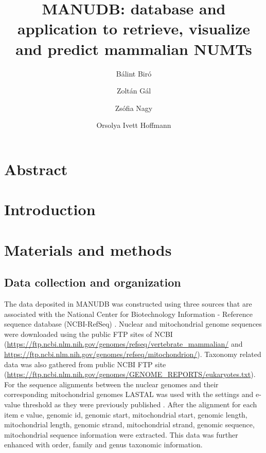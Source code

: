 \documentclass{article}
\title{MANUDB: database and application to retrieve, visualize and predict mammalian NUMTs}
\begin{document}
\author[1,2]{Bálint Biró}
\author[2]{Zoltán Gál}
\author[2]{Zsófia Nagy}
\author[2]{Orsolya Ivett Hoffmann}

\date{}

\maketitle

\section{Abstract}
\section{Introduction}
\section{Materials and methods}
\subsection{Data collection and organization}
The data deposited in MANUDB was constructed using three sources that are associated with the National Center for Biotechnology Information - Reference sequence database (NCBI-RefSeq) \cite{ncbi_refseq}. Nuclear and mitochondrial genome sequences were downloaded using the public FTP sites of NCBI (\url{https://ftp.ncbi.nlm.nih.gov/genomes/refseq/vertebrate_mammalian/} and \url{https://ftp.ncbi.nlm.nih.gov/genomes/refseq/mitochondrion/}). Taxonomy related data was also gathered from public NCBI FTP site (\url{https://ftp.ncbi.nlm.nih.gov/genomes/GENOME_REPORTS/eukaryotes.txt}). For the sequence alignments between the nuclear genomes and their corresponding mitochondrial genomes LASTAL \cite{lastal} was used with the settings and e-value threshold as they were previously published \cite{tsuji}. After the alignment for each item e value, genomic id, genomic start, mitochondrial start, genomic length, mitochondrial length, genomic strand, mitochondrial strand, genomic sequence, mitochondrial sequence information were extracted. This data was further enhanced with order, family and genus taxonomic information.
\end{document}
